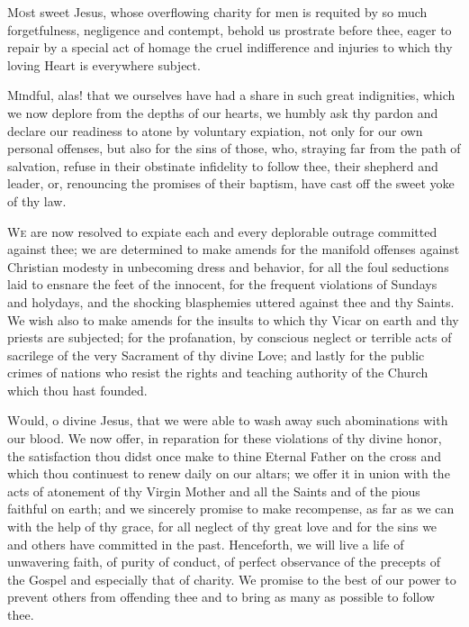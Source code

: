 
\begin{enpars}


\lettrine{M}{o}st sweet Jesus, whose overflowing charity for men is requited by so much
forgetfulness, negligence and contempt, behold us prostrate before thee, eager to
repair by a special act of homage the cruel indifference and injuries to which thy loving
Heart is everywhere subject.

\lettrine{M}{i}ndful, alas! that we ourselves have had a share in such great indignities, which we
now deplore from the depths of our hearts, we humbly ask thy pardon and declare
our readiness to atone by voluntary expiation, not only for our own personal offenses,
but also for the sins of those, who, straying far from the path of salvation, refuse in
their obstinate infidelity to follow thee, their shepherd and leader, or, renouncing the
promises of their baptism, have cast off the sweet yoke of thy law.

\lettrine{W}{e} are now resolved to expiate each and every deplorable outrage committed
against thee; we are determined to make amends for the manifold offenses against
Christian modesty in unbecoming dress and behavior, for all the foul seductions laid to
ensnare the feet of the innocent, for the frequent violations of Sundays and holydays,
and the shocking blasphemies uttered against thee and thy Saints.
We wish also to make amends for the insults to which thy Vicar on earth and thy
priests are subjected; for the profanation, by conscious neglect or terrible acts of
sacrilege of the very Sacrament of thy divine Love; and lastly for the public crimes
of nations who resist the rights and teaching authority of the Church which thou hast
founded.

\lettrine{W}{o}uld, o divine Jesus, that we were able to wash away such abominations with our
blood. We now offer, in reparation for these violations of thy divine honor, the
satisfaction thou didst once make to thine Eternal Father on the cross and which thou
continuest to renew daily on our altars; we offer it in union with the acts of atonement of
thy Virgin Mother and all the Saints and of the pious faithful on earth; and we sincerely
promise to make recompense, as far as we can with the help of thy grace, for all neglect
of thy great love and for the sins we and others have committed in the past.
Henceforth, we will live a life of unwavering faith, of purity of conduct, of perfect
observance of the precepts of the Gospel and especially that of charity. We promise
to the best of our power to prevent others from offending thee and to bring as many
as possible to follow thee.


\end{enpars}
